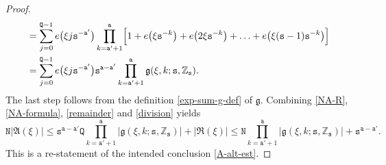 \documentclass[12pt, twoside]{article}
\theoremstyle{definition}
\numberwithin{equation}{section}
\begin{document}
\begin{proof}
\begin{align}
&= \sum_{j=0}^{\mathtt Q-1} e \bigl(\xi j \mathtt s^{-\mathtt a'}\bigr) \prod_{k=\mathtt a'+1}^{\mathtt a} \Bigl[ 1 + e \bigl(\xi \mathtt s^{ -k} \bigr) + e\bigl( 2\xi \mathtt s^{- k} \bigr) + \ldots + e \bigl( \xi(\mathtt s-1) \mathtt s^{-k} \bigr) \Bigr] \nonumber \\ 
&= \sum_{j=0}^{\mathtt Q-1} e \bigl( \xi j \mathtt s^{-\mathtt a'}\bigr) \mathtt s^{\mathtt a-\mathtt a'} \prod_{k=\mathtt a'+1}^{\mathtt a} \mathfrak g(\xi, k; \mathtt s, \mathbb Z_{\mathtt s}). \label{NA-R}
\end{align} 
The last step follows from the definition \eqref{exp-sum-g-def} of $\mathfrak g$. Combining \eqref{NA-R}, \eqref{NA-formula}, \eqref{remainder} and \eqref{division} yields  
\[ \mathtt N |\mathfrak A(\xi)| \leq \mathtt s^{\mathtt a-\mathtt a'}\mathtt Q \prod_{k=\mathtt a'+1}^{\mathtt a} \bigl| \mathfrak g(\xi, k; \mathtt s, \mathbb Z_{\mathtt s}) \bigr| + \bigl|\mathfrak R(\xi) \bigr| \leq \mathtt N \prod_{k=\mathtt a'+1}^{\mathtt a}\bigl| \mathfrak g(\xi, k; \mathtt s, \mathbb Z_{\mathtt s}) \bigr|  +  \mathtt s^{\mathtt a-\mathtt a'}. \] 
This is a re-statement of the intended conclusion \eqref{A-alt-est}. 
\end{proof} 
\end{document}
